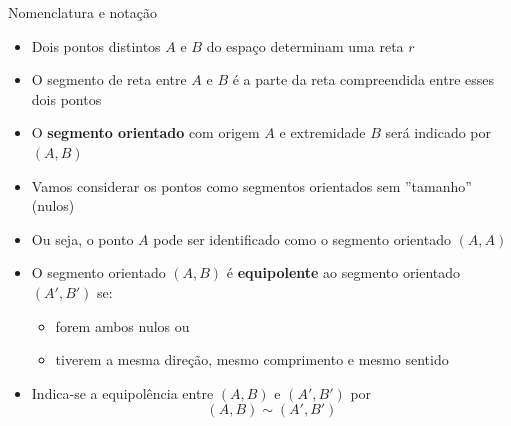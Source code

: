 \begin{frame}{Nomenclatura e notação}
    \begin{itemize}[<+->]
        \item Dois pontos distintos \(A\) e \(B\) do espaço determinam uma reta \(r\)
        \item O segmento de reta entre \(A\) e \(B\) é a parte da reta compreendida entre esses dois pontos
        \item O \textbf{segmento orientado} com origem \(A\) e extremidade \(B\) será indicado por \((A,B)\)
        \item Vamos considerar os pontos como segmentos orientados sem ''tamanho'' (nulos)
        \item Ou seja, o ponto \(A\) pode ser identificado como o segmento orientado \((A,A)\)
        \item O segmento orientado \((A,B)\) é \textbf{equipolente} ao segmento orientado \((A',B')\) se:
            \begin{itemize}[<.->]
                \item forem ambos nulos ou
                \item tiverem a mesma direção, mesmo comprimento e mesmo sentido
            \end{itemize}
        \item Indica-se a equipolência entre \((A,B)\) e \((A',B')\) por
            \[
                (A,B) \sim (A',B')
            \]
    \end{itemize}
\end{frame}

